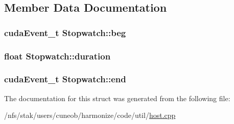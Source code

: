 \subsection{Member Data Documentation}
\hypertarget{structStopwatch_a7a146443efd2e5638d9c810e01e1a0ff}{
\subsubsection[{beg}]{\setlength{\rightskip}{0pt plus 5cm}cuda\-Event\-\_\-t Stopwatch\-::beg}}\label{structStopwatch_a7a146443efd2e5638d9c810e01e1a0ff}
\hypertarget{structStopwatch_ace5014e6a1019be6e33fcbb5df2b7507}{
\subsubsection[{duration}]{\setlength{\rightskip}{0pt plus 5cm}float Stopwatch\-::duration}}\label{structStopwatch_ace5014e6a1019be6e33fcbb5df2b7507}
\hypertarget{structStopwatch_a64aa6d26f2a0d37545496d0ef23234e8}{
\subsubsection[{end}]{\setlength{\rightskip}{0pt plus 5cm}cuda\-Event\-\_\-t Stopwatch\-::end}}\label{structStopwatch_a64aa6d26f2a0d37545496d0ef23234e8}


The documentation for this struct was generated from the following file\-:\begin{DoxyCompactItemize}
\item 
/nfs/stak/users/cuneob/harmonize/code/util/\hyperlink{host_8cpp}{host.\-cpp}\end{DoxyCompactItemize}
